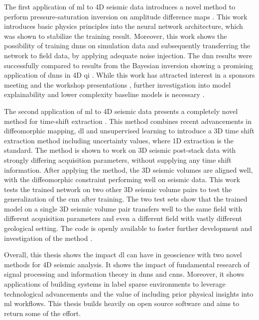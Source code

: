 The first application of \acl{ml} to 4D seismic data introduces a novel method to perform pressure-saturation inversion on amplitude difference maps \citep{dramsch2019deep}. This work introduces basic physics principles into the neural network architecture, which was shown to stabilize the training result. Moreover, this work shows the possibility of training \aclp{dnn} on simulation data and subsequently transferring the network to field data, by applying adequate noise injection. The \acl{dnn} results were successfully compared to results from the Bayesian inversion showing a promising application of \aclp{dnn} in 4D \acl{qi} \citep{dramsch2019deep}. While this work has attracted interest in a sponsors meeting and the workshop presentations \citep{dramsch2019deep,dramsch2019including}, further investigation into model explainability and lower complexity baseline models is necessary \citep[in preparation][]{corte2019exploring,dramsch2020physics}.

The second application of \acl{ml} to 4D seismic data presents a completely novel method for time-shift extraction \citep{dramsch20193dwarping}. This method combines recent advancements in diffeomorphic mapping, \acl{dl} and unsupervised learning to introduce a 3D time shift extraction method including uncertainty values, where 1D extraction is the standard. The method is shown to work on 3D seismic post-stack data with strongly differing acquisition parameters, without supplying any time shift information. After applying the method, the 3D seismic volumes are aligned well, with the diffeomorphic constraint performing well on seismic data. This work tests the trained network on two other 3D seismic volume pairs to test the generalization of the \acl{cnn} after training. The two test sets show that the trained model on a single 3D seismic volume pair transfers well to the same field with different acquisition parameters and even a different field with vastly different geological setting. The code is openly available to foster further development and investigation of the method \citep{dramsch20203dwarpingcode}.

Overall, this thesis shows the impact \acl{dl} can have in geoscience with two novel methods for 4D seismic analysis. It shows the impact of fundamental research of signal processing and information theory in \aclp{dnn} and \aclp{cnn}. Moreover, it shows applications of building systems in label sparse environments to leverage technological advancements and the value of including prior physical insights into \acl{ml} workflows. This thesis builds heavily on open source software and aims to return some of the effort.

\nocite{haris_iqbal_2018_2526396}